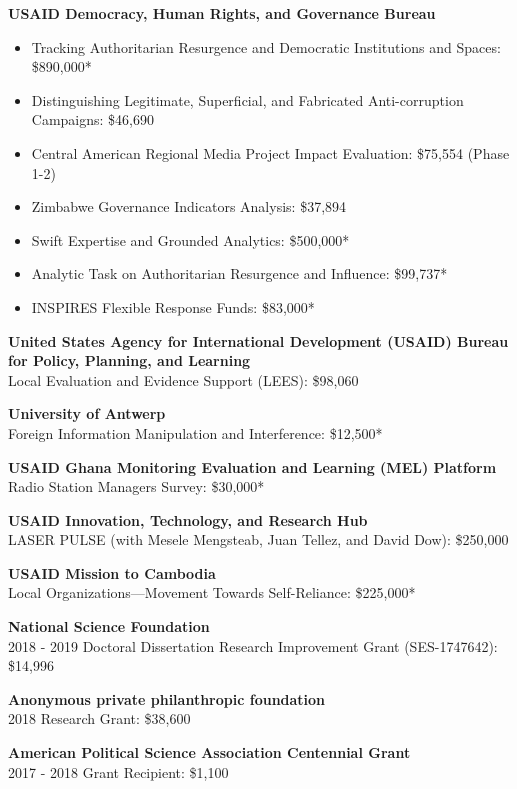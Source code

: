 \documentclass[11pt]{article}
\begin{document}
\textbf{USAID Democracy, Human Rights, and Governance Bureau}
\begin{itemize} \itemsep -5pt
\item Tracking Authoritarian Resurgence and Democratic Institutions and Spaces: \$890,000*
\item Distinguishing Legitimate, Superficial, and Fabricated Anti-corruption Campaigns: \$46,690
\item Central American Regional Media Project Impact Evaluation: \$75,554 (Phase 1-2)
\item Zimbabwe Governance Indicators Analysis: \$37,894
\item Swift Expertise and Grounded Analytics: \$500,000*
\item Analytic Task on Authoritarian Resurgence and Influence: \$99,737*
\item INSPIRES Flexible Response Funds: \$83,000*
\end{itemize}

\textbf{United States Agency for International Development (USAID) Bureau for Policy, Planning, and Learning}\\
\hspace{1em} Local Evaluation and Evidence Support (LEES): \$98,060

\textbf{University of Antwerp}\\
\hspace{1em} Foreign Information Manipulation and Interference: \$12,500*

\textbf{USAID Ghana Monitoring Evaluation and Learning (MEL) Platform}\\
Radio Station Managers Survey: \$30,000*

\textbf{USAID Innovation, Technology, and Research Hub}\\
LASER PULSE (with Mesele Mengsteab, Juan Tellez, and David Dow): \$250,000

\textbf{USAID Mission to Cambodia}\\
Local Organizations—Movement Towards Self-Reliance: \$225,000*

\textbf{National Science Foundation}\\
2018 - 2019 Doctoral Dissertation Research Improvement Grant (SES-1747642): \$14,996

\textbf{Anonymous private philanthropic foundation}\\
2018 Research Grant: \$38,600

\textbf{American Political Science Association Centennial Grant}\\
2017 - 2018 Grant Recipient: \$1,100
\bigskip
\end{document}

